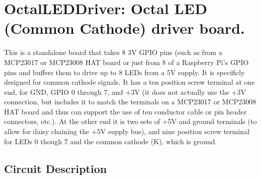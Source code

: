 %
%
%
%
% 
%
%
%
%
%
% 
%

\chapter{OctalLEDDriver: Octal LED (Common Cathode) driver board.}

This is a standalone board that takes 8 3V GPIO pins (such as from a MCP23017 
or MCP23008 HAT board or just from 8 of a Raspberry Pi's GPIO pins and buffers 
them to drive up to 8 LEDs from a 5V supply.  It is specificly designed for 
common cathode signals.  It has a ten position screw terminal at one end, for 
GND, GPIO 0 through 7, and +3V (it does not actually use the +3V connection, 
but includes it to match the terminals on a MCP23017 or MCP23008 HAT board and 
thus can support the use of ten conductor cable or pin header connectors, 
etc.).  At the other end it is two sets of +5V and ground terminals (to allow 
for daisy chaining the +5V supply bus), and nine position screw terminal for 
LEDs 0 though 7 and the common cathode (K), which is ground.

\section{Circuit Description}

